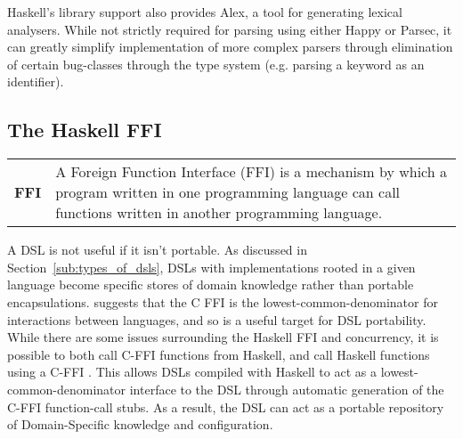 \documentclass[a4paper,11pt]{report}
\newcommand{\defblock}[3]{
    \begin{longtable}{l p{#1}} 
        \textbf{#2} & #3
    \end{longtable}
}
\begin{document}
Haskell's library support also provides Alex, a tool for generating lexical analysers. 
While not strictly required for parsing using either Happy or Parsec, it can greatly simplify implementation of more complex parsers through elimination of certain bug-classes through the type system (e.g. parsing a keyword as an identifier).


\subsection{The Haskell FFI} %
\label{sub:the_haskell_ffi}
\defblock{12cm}{FFI}{A Foreign Function Interface (FFI) is a mechanism by which a program written in one programming language can call functions written in another programming language.}

A DSL is not useful if it isn't portable.
As discussed in Section~\ref{sub:types_of_dsls}, DSLs with implementations rooted in a given language become specific stores of domain knowledge rather than portable encapsulations.
\citet{Marlow:2004:EHF:1017472.1017479} suggests that the C FFI is the lowest-common-denominator for interactions between languages, and so is a useful target for DSL portability.\\

While there are some issues surrounding the Haskell FFI and concurrency, it is possible to both call C-FFI functions from Haskell, and call Haskell functions using a C-FFI \citep{Marlow:2004:EHF:1017472.1017479,HaskellWikiFFIFromC}.
This allows DSLs compiled with Haskell to act as a lowest-common-denominator interface to the DSL through automatic generation of the C-FFI function-call stubs. 
As a result, the DSL can act as a portable repository of Domain-Specific knowledge and configuration. 

\end{document}
